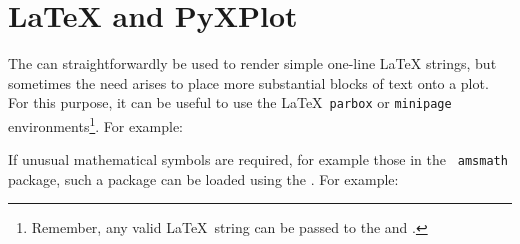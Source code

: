 \section{LaTeX and PyXPlot}

The  can straightforwardly be used to render simple one-line
\LaTeX{} strings, but sometimes the need arises to place more
substantial blocks of text onto a plot. For this purpose, it can be useful to
use the \LaTeX\ {\tt parbox} or {\tt minipage} environments\footnote{Remember,
any valid \LaTeX\ string can be passed to the  and .}. For example:



\begin{center}
\end{center}

If unusual mathematical symbols are required, for example those in the {\tt
amsmath} package, such a package
can be loaded using the . For example:



\begin{center}
\end{center}

